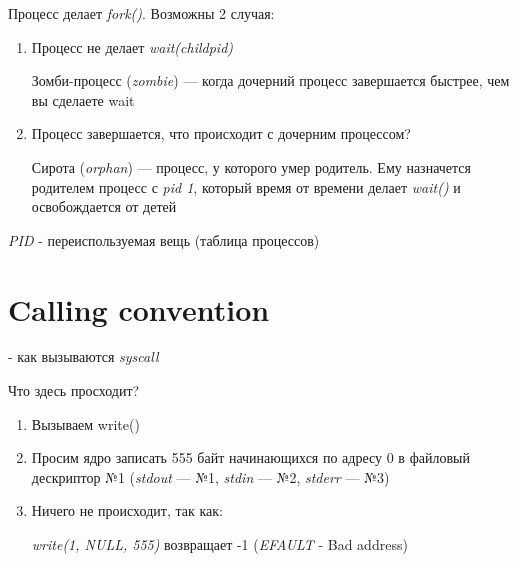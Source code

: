 \documentclass[../../lectures.tex]{subfiles}
\begin{document}
Процесс делает \emph{fork()}. Возможны 2 случая:
\begin{enumerate}
    \item 
        Процесс не делает \emph{wait(childpid)}

        Зомби-процесс (\emph{zombie}) --- когда дочерний процесс завершается быстрее, чем вы сделаете wait
    \item 
        Процесс завершается, что происходит с дочерним процессом?

        Сирота (\emph{orphan}) --- процесс, у которого умер родитель. 
        Ему назначется родителем процесс с \emph{pid 1}, который время от времени делает \emph{wait()} и освобождается от детей
\end{enumerate}
\emph{PID} - переиспользуемая вещь (таблица процессов)

\newpage
\section{Calling convention}
 - как вызываются \emph{syscall}


Что здесь просходит?
\begin{enumerate}
    \item Вызываем write()
    \item Просим ядро записать 555 байт начинающихся по адресу 0 в файловый дескриптор №1 
          (\emph{stdout} --- №1, \emph{stdin} --- №2, \emph{stderr} --- №3)
    \item Ничего не происходит, так как:

          \emph{write(1, NULL, 555)} возвращает -1 (\emph{EFAULT} - Bad address)
\end{enumerate}
\end{document}
